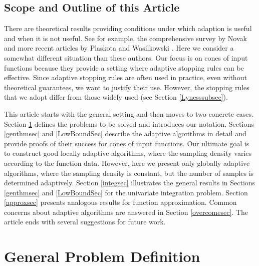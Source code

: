 \documentclass[]{elsarticle}
\theoremstyle{definition}
\theoremstyle{remark}
\begin{document}
\subsection{Scope and Outline of this Article} 
There are theoretical results providing conditions under which adaption is useful and when it is not useful. See for example, the comprehensive survey by Novak \cite{Nov96a} and more recent articles by Plaskota and Wasilkowski \cite{PlaWas05a,PlaEtal08a}. Here we consider a somewhat different situation than these authors.  Our focus is on cones of input functions because they provide a setting where adaptive stopping rules can be effective. Since adaptive stopping rules are often used in practice, even without theoretical guarantees, we want to justify their use.  However, the stopping rules that we adopt differ from those widely used (see Section \ref{Lynesssubsec}).

This article starts with the general setting and then moves to two concrete cases.  Section \ref{probdefsec} defines the problems to be solved and introduces our notation.  Sections \ref{genthmsec} and \ref{LowBoundSec} describe the adaptive algorithms in detail and provide proofs of their success for cones of input functions.  Our ultimate goal is to construct good locally adaptive algorithms, where the sampling density varies according to the function data.  However, here we present only globally adaptive algorithms, where the sampling density is constant, but the number of samples is determined adaptively.  Section \ref{integsec} illustrates the general results in Sections \ref{genthmsec} and \ref{LowBoundSec} for the univariate integration problem.  Section \ref{approxsec}  presents analogous results for function approximation.  Common concerns about adaptive algorithms are answered in Section \ref{overcomesec}. The article ends with several suggestions for future work.

\section{General Problem Definition} \label{probdefsec}
\end{document}
